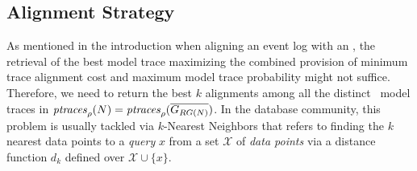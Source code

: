 
\subsection{Alignment Strategy}\label{subsec:as}
As mentioned in the introduction when aligning an event log with an \uswn, the retrieval of the best model trace maximizing the combined provision of minimum trace alignment cost and maximum model trace probability might not suffice.
Therefore, we need to return the best $k$ alignments among all the distinct \unravelled\ model traces in $\mathit{ptraces}_{\rho}(N)=\mathit{ptraces}_{\rho}(\overline{G_{RG(N)}})$. In the database community, this problem is usually tackled via $k$-Nearest Neighbors that refers to finding the $k$ nearest data points to a \textit{query} $x$ from a set $\mathcal{X}$ of \textit{data points} via a distance function $d_k$ defined over $\mathcal{X}\cup\{x\}$.


